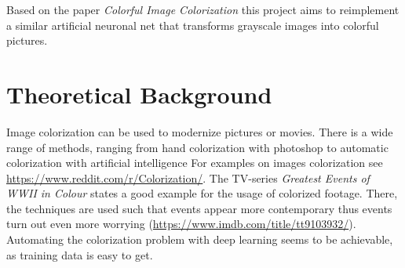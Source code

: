 \documentclass[12pt,letterpaper]{article}
\begin{document}
Based on the paper \emph{Colorful Image Colorization} \citep{Zhang.2016} this project aims to reimplement a similar artificial neuronal net that transforms grayscale images into colorful pictures.\\

\section{Theoretical Background}
Image colorization can be used to modernize pictures or movies. There is a wide range of methods, ranging from hand colorization with photoshop to automatic colorization with artificial intelligence For examples on images colorization see \url{https://www.reddit.com/r/Colorization/}. The TV-series \emph{Greatest Events of WWII in Colour} states a good example for the usage of colorized footage. There, the techniques are used such that events appear more contemporary thus events turn out even more worrying (\url{https://www.imdb.com/title/tt9103932/}). 
Automating the colorization problem with deep learning seems to be achievable, as training data is easy to get.
\end{document}
